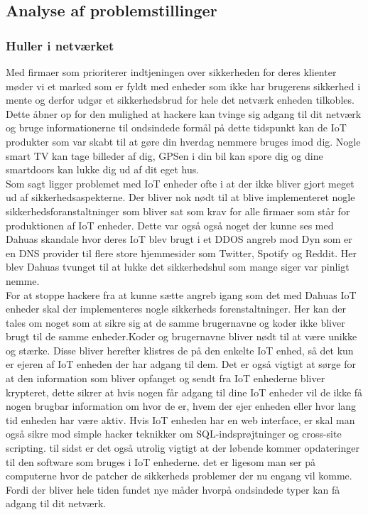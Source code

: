     \subsection{Analyse af problemstillinger}
    
        \subsubsection{Huller i netværket}
        Med firmaer som prioriterer indtjeningen over sikkerheden for deres klienter møder vi et marked som er fyldt med enheder som ikke har brugerens sikkerhed i mente og derfor udgør et sikkerhedsbrud for hele det netværk enheden tilkobles.\\
        Dette åbner op for den mulighed at hackere kan tvinge sig adgang til dit netværk og bruge informationerne til ondsindede formål på dette tidspunkt kan de IoT produkter som var skabt til at gøre din hverdag nemmere bruges imod dig. Nogle smart TV kan tage billeder af dig, GPSen i din bil kan spore dig og dine smartdoors kan lukke dig ud af dit eget hus.\\
        
        
        Som sagt ligger problemet med IoT enheder ofte i at der ikke bliver gjort meget ud af sikkerhedsaspekterne. Der bliver nok nødt til at blive implementeret nogle sikkerhedsforanstaltninger som bliver sat som krav for alle firmaer som står for produktionen af IoT enheder. Dette var også også noget der kunne ses med Dahuas skandale hvor deres IoT blev brugt i et DDOS angreb mod Dyn som er en DNS provider til flere store hjemmesider som Twitter, Spotify og Reddit. Her blev Dahuas tvunget til at lukke det sikkerhedshul som mange siger var pinligt nemme.\\
            For at stoppe hackere fra at kunne sætte angreb igang som det med Dahuas IoT enheder skal der implementeres nogle sikkerheds forenstaltninger. Her  kan der tales om noget som at sikre sig at de samme brugernavne og koder ikke bliver brugt til de samme enheder.Koder og brugernavne bliver nødt til at være unikke og stærke. Disse bliver herefter klistres de på den enkelte IoT enhed, så det kun er ejeren af IoT enheden der har adgang til dem. Det er også vigtigt at sørge for at den information som bliver opfanget og sendt fra IoT enhederne bliver krypteret, dette sikrer at hvis nogen får adgang til dine IoT enheder vil de ikke få nogen brugbar information om hvor de er, hvem der ejer enheden eller hvor lang tid enheden har være aktiv. Hvis IoT enheden har en web interface, er skal man også sikre mod simple hacker teknikker om SQL-indsprøjtninger og cross-site scripting. til sidst er det også utrolig vigtigt at der løbende kommer opdateringer til den software som bruges i IoT enhederne. det er ligesom man ser på computerne hvor de patcher de sikkerheds problemer der nu engang vil komme. Fordi der bliver hele tiden fundet nye måder hvorpå ondsindede typer kan få adgang til dit netværk.\autocite{Ref10}\\ 
        
